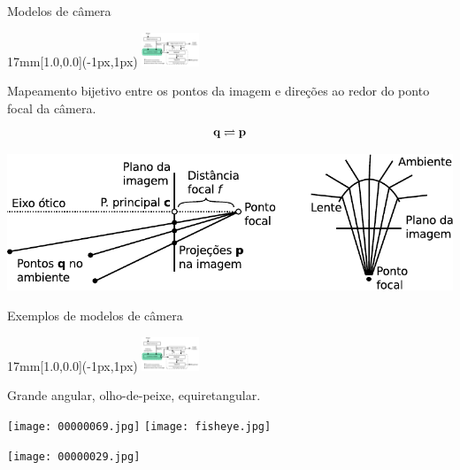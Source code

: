 \begin{frame}{Modelos de câmera}
  \begin{textblock*}{17mm}[1.0,0.0](\paperwidth-1px,1px)
    \includegraphics[width=17mm]{blocos_s2.png}
  \end{textblock*}
  Mapeamento bijetivo entre os pontos da imagem e direções ao redor do ponto
  focal da câmera.  
  \[{\mathbf{q}}\rightleftharpoons{\mathbf{p}}\]

  \begin{center}
    \includegraphics[height=6\baselineskip]{camera_model.pdf}   
  \end{center}
\end{frame}


\begin{frame}{Exemplos de modelos de câmera}
  \begin{textblock*}{17mm}[1.0,0.0](\paperwidth-1px,1px)
    \includegraphics[width=17mm]{blocos_s2.png}
  \end{textblock*}
  Grande angular, olho-de-peixe, equiretangular.
  \centerline{
    \texttt{[image: 00000069.jpg]}
    \texttt{[image: fisheye.jpg]}
  }
  \centerline{
    \texttt{[image: 00000029.jpg]}
  }
\end{frame}


